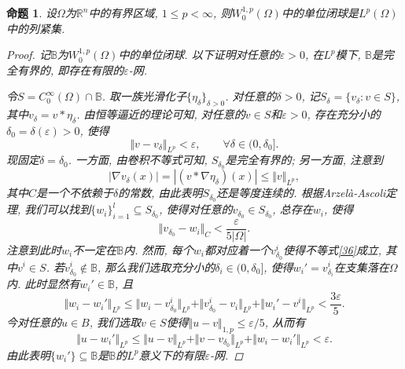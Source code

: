 \documentclass[12pt,a4paper]{article}
\newtheorem{proposition}[theorem]{命题}
\begin{document}
\begin{proposition}
    设$\Omega$为$\mathbb{R}^n$中的有界区域, $1 \leq p < \infty$, 则$W_0^{1, p}(\Omega)$中的单位闭球是$L^p(\Omega)$中的列紧集.
    \begin{proof}
        记$\mathbb{B}$为$W_0^{1, p}(\Omega)$中的单位闭球. 以下证明对任意的$\varepsilon > 0$, 在$L^p$模下, $\mathbb{B}$是完全有界的, 即存在有限的$\varepsilon$-网. 

        令$S = C_0^{\infty}(\Omega) \cap \mathbb{B}$. 取一族光滑化子$\{\eta_{\delta}\}_{\delta > 0}$.
        对任意的$\delta > 0$, 记$S_{\delta} = \{v_{\delta}\colon v \in S\}$, 其中$v_{\delta} = v \ast \eta_{\delta}$.
        由恒等逼近的理论可知, 对任意的$v \in S$和$\varepsilon > 0$, 存在充分小的$\delta_0 = \delta(\varepsilon) > 0$, 使得 
        \begin{equation*}
            \Vert v - v_{\delta} \Vert_{L^p} < \varepsilon, \qquad \forall \delta \in (0, \delta_0].
        \end{equation*}
        现固定$\delta = \delta_0$. 一方面, 由卷积不等式可知, $S_{\delta_0}$是完全有界的; 另一方面, 注意到 
        \begin{equation*}
            |\nabla v_{\delta}(x)| = |(v \ast \nabla\eta_{\delta})(x)| \leq \Vert v \Vert_{L^p},
        \end{equation*}
        其中$C$是一个不依赖于$\delta$的常数, 由此表明$S_{\delta_0}$还是等度连续的. 
        根据Arzelà-Ascoli定理, 我们可以找到$\{w_i\}_{i = 1}^l \subseteq S_{\delta_0}$, 使得对任意的$v_{\delta_0} \in S_{\delta_0}$, 总存在$w_i$, 使得 
        \begin{equation}\label{36}
            \Vert v_{\delta_0} - w_i\Vert_C < \frac{\varepsilon}{5|\Omega|}.
        \end{equation} 
        注意到此时$w_i$不一定在$\mathbb{B}$内. 然而, 每个$w_i$都对应着一个$v_{\delta_0}^i$使得不等式\eqref{36}成立, 其中$v^i \in S$.
        若$v_{\delta_0}^i \notin \mathbb{B}$, 那么我们选取充分小的$\delta_i \in (0, \delta_0]$, 使得$w_i' = v_{\delta_i}^i$在支集落在$\Omega$内.
        此时显然有$w_i' \in \mathbb{B}$, 且 
        \begin{equation*}
            \Vert w_i - w_i'\Vert_{L^p} \leq \Vert w_i - v^i_{\delta_0}\Vert_{L^p} + \Vert v^i_{\delta_0} - v_i\Vert_{L^p} +  \Vert w_i' - v^i\Vert_{L^p} < \frac{3\varepsilon}{5}.
        \end{equation*}
        今对任意的$u \in B$, 我们选取$v \in S$使得$\Vert u - v \Vert_{1, p} \leq \varepsilon/5$, 从而有 
        \begin{equation*}
            \Vert u - w_i'\Vert_{L^p} \leq \Vert u - v \Vert_{L^p} + \Vert v - v_{\delta_0} \Vert_{L^p} + \Vert w_i - w_i'\Vert_{L^p} < \varepsilon.
        \end{equation*}
        由此表明$\{w_i'\} \subseteq \mathbb{B}$是$\mathbb{B}$的$L^p$意义下的有限$\varepsilon$-网.
    \end{proof}
\end{proposition}
\end{document}

